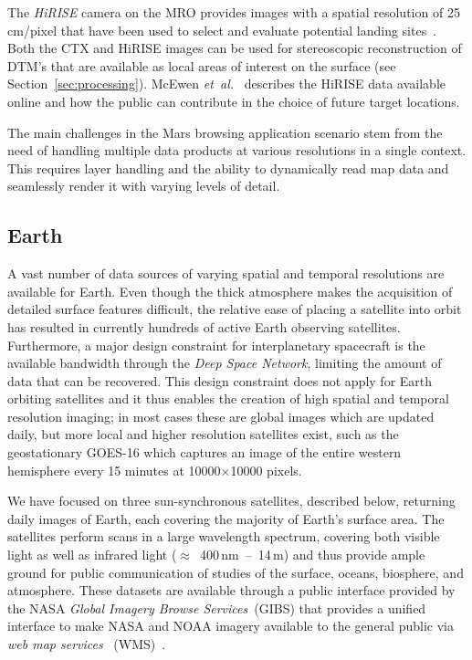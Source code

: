 \documentclass[journal]{vgtc}                %
\newcommand{\etal}{\emph{et~al.}}
\begin{document}
The \emph{HiRISE} camera on the MRO provides images with a spatial resolution of 25\,cm/pixel that have been used to select and evaluate potential landing sites~\cite{mcewen2007mars}.
Both the CTX and HiRISE images can be used for stereoscopic reconstruction of DTM's that are available as local areas of interest on the surface (see Section~\ref{sec:processing}).
McEwen \etal~\cite{mcewen2016people} describes the HiRISE data available online and how the public can contribute in the choice of future target locations.

The main challenges in the Mars browsing application scenario stem from the need of handling multiple data products at various resolutions in a single context.
This requires layer handling and the ability to dynamically read map data and seamlessly render it with varying levels of detail.

\subsection{Earth} \label{sec:scenario:earth}
A vast number of data sources of varying spatial and temporal resolutions are available for Earth.
Even though the thick atmosphere makes the acquisition of detailed surface features difficult, the relative ease of placing a satellite into orbit has resulted in currently hundreds of active Earth observing satellites.
Furthermore, a major design constraint for interplanetary spacecraft is the available bandwidth through the \emph{Deep Space Network}, limiting the amount of data that can be recovered.
This design constraint does not apply for Earth orbiting satellites and it thus enables the creation of high spatial and temporal resolution imaging; in most cases these are global images which are updated daily, but more local and higher resolution satellites exist, such as the geostationary GOES-16 which captures an image of the entire western hemisphere every 15 minutes at 10000$\times$10000 pixels.

We have focused on three sun-synchronous satellites, described below, returning daily images of Earth, each covering the majority of Earth's surface area.
The satellites perform scans in a large wavelength spectrum, covering both visible light as well as infrared light ($\approx$~400\,nm~--~14\,\textmu m) and thus provide ample ground for public communication of studies of the surface, oceans, biosphere, and atmosphere.
These datasets are available through a public interface provided by the NASA \emph{Global Imagery Browse Services}~(GIBS) that provides a unified interface to make NASA and NOAA imagery available to the general public via \emph{web map services}~  (WMS)~\cite{cechini2013expanding}.
\end{document}
